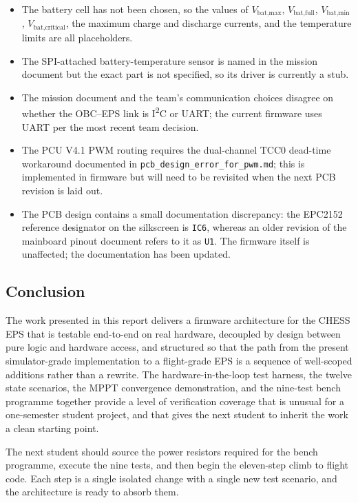 \begin{itemize}
\item The battery cell has not been chosen, so the values of
$V_{\text{bat,max}}$, $V_{\text{bat,full}}$,
$V_{\text{bat,min}}$, $V_{\text{bat,critical}}$, the maximum
charge and discharge currents, and the temperature limits are
all placeholders.
\item The SPI-attached battery-temperature sensor is named in
the mission document but the exact part is not specified, so
its driver is currently a stub.
\item The mission document and the team's communication
choices disagree on whether the OBC--EPS link is
I\textsuperscript{2}C or UART; the current firmware uses UART
per the most recent team decision.
\item The PCU V4.1 PWM routing requires the dual-channel TCC0
dead-time workaround documented in
\texttt{pcb\_design\_error\_for\_pwm.md}; this is implemented
in firmware but will need to be revisited when the next PCB
revision is laid out.
\item The PCB design contains a small documentation
discrepancy: the EPC2152 reference designator on the
silkscreen is \texttt{IC6}, whereas an older revision of the
mainboard pinout document refers to it as \texttt{U1}. The
firmware itself is unaffected; the documentation has been
updated.
\end{itemize}

\subsection{Conclusion}

The work presented in this report delivers a firmware
architecture for the CHESS EPS that is testable end-to-end on
real hardware, decoupled by design between pure logic and
hardware access, and structured so that the path from the
present simulator-grade implementation to a flight-grade EPS
is a sequence of well-scoped additions rather than a rewrite.
The hardware-in-the-loop test harness, the twelve state
scenarios, the MPPT convergence demonstration, and the
nine-test bench programme together provide a level of
verification coverage that is unusual for a one-semester
student project, and that gives the next student to inherit
the work a clean starting point.

The next student should source the power resistors required
for the bench programme, execute the nine tests, and then
begin the eleven-step climb to flight code. Each step is a
single isolated change with a single new test scenario, and
the architecture is ready to absorb them.
